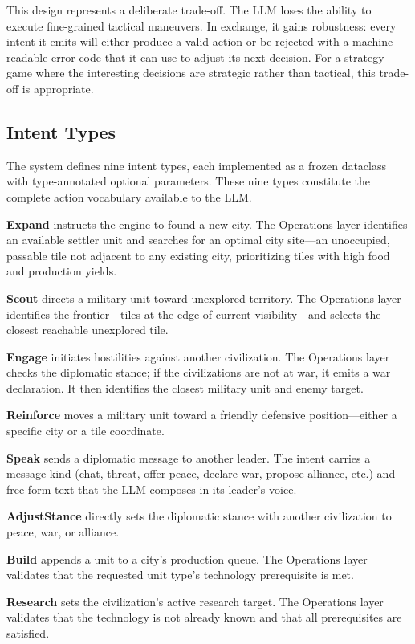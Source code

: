 \documentclass[conference]{IEEEtran}
\begin{document}
This design represents a deliberate trade-off. The LLM loses the ability to
execute fine-grained tactical maneuvers. In exchange, it gains robustness:
every intent it emits will either produce a valid action or be rejected
with a machine-readable error code that it can use to adjust its next
decision. For a strategy game where the interesting decisions are strategic
rather than tactical, this trade-off is appropriate.

\subsection{Intent Types}

The system defines nine intent types, each implemented as a frozen
dataclass with type-annotated optional parameters. These nine types
constitute the complete action vocabulary available to the LLM.

\textbf{Expand} instructs the engine to found a new city. The Operations
layer identifies an available settler unit and searches for an optimal city
site---an unoccupied, passable tile not adjacent to any existing city,
prioritizing tiles with high food and production yields.

\textbf{Scout} directs a military unit toward unexplored territory. The
Operations layer identifies the frontier---tiles at the edge of current
visibility---and selects the closest reachable unexplored tile.

\textbf{Engage} initiates hostilities against another civilization. The
Operations layer checks the diplomatic stance; if the civilizations are not
at war, it emits a war declaration. It then identifies the closest military
unit and enemy target.

\textbf{Reinforce} moves a military unit toward a friendly defensive
position---either a specific city or a tile coordinate.

\textbf{Speak} sends a diplomatic message to another leader. The intent
carries a message kind (chat, threat, offer peace, declare war, propose
alliance, etc.) and free-form text that the LLM composes in its leader's
voice.

\textbf{AdjustStance} directly sets the diplomatic stance with another
civilization to peace, war, or alliance.

\textbf{Build} appends a unit to a city's production queue. The Operations
layer validates that the requested unit type's technology prerequisite is met.

\textbf{Research} sets the civilization's active research target. The
Operations layer validates that the technology is not already known and
that all prerequisites are satisfied.
\end{document}
